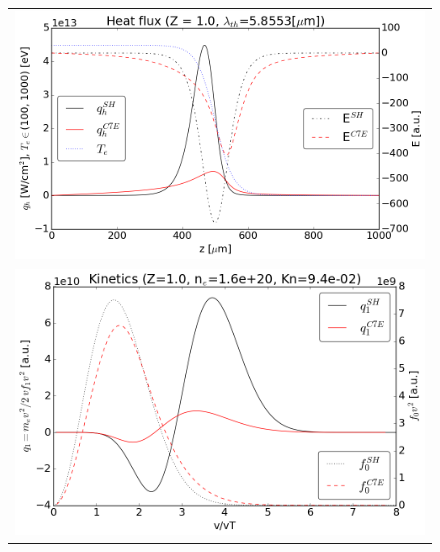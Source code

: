 \documentclass[preprint,12pt]{elsarticle}
\begin{document}
\begin{figure}[tbh]
  \begin{center}
    \begin{tabular}{c}
      \includegraphics[width=1.0\textwidth]{../results/fe_analysis/C7E/P5_heatflux_Z1_Kn72e-3.png} \\ 
      \includegraphics[width=1.0\textwidth]{../results/fe_analysis/C7E/P5_kinetics_Z1_Kn72e-3.png}
    \end{tabular}
  \caption{
  }
  \end{center}
  \label{fig:AWBScorrection_f1}
\end{figure}
\end{document}
